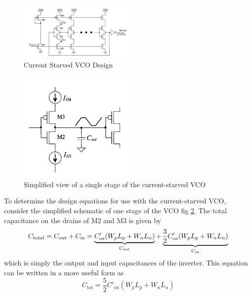 \begin{figure}[h]
	\centering
	\includegraphics[width=0.5\textwidth]{figs/cs_vco_design.png}
	\caption{Current Starved VCO Design}
	\label{fig:cs_vco_design}
	\vspace{0.5cm}
\end{figure}
\begin{figure}[h]
	\centering
	\includegraphics[width=0.5\textwidth]{figs/vco_simplified.png}
	\caption{Simplified view of a single stage of the current-starved VCO}
	\label{fig:vco_simplified}
\end{figure}

To determine the design equations for use with the current-starved VCO, consider
the simplified schematic of one stage of the VCO fig \ref{fig:vco_simplified}. The total
capacitance on the drains of M2 and M3 is given by
\begin{equation}
	C_{\text{total}} = C_{\text{out}} + C_{\text{in}} = 
\underbrace{C'_{\text{ox}}(W_p L_p + W_n L_n)}_{\text{C\textsubscript{out}}} + 
\underbrace{\frac{3}{2} C'_{\text{ox}}(W_p L_p + W_n L_n)}_{\text{C\textsubscript{in}}}
\end{equation}
which is simply the output and input capacitances of the inverter. This equation can be written in a more useful form as
\begin{equation}
C_{\text{tot}} = \frac{5}{2} C'_{\text{ox}} (W_p L_p + W_n L_n)
\tag{19.19}
\end{equation}

